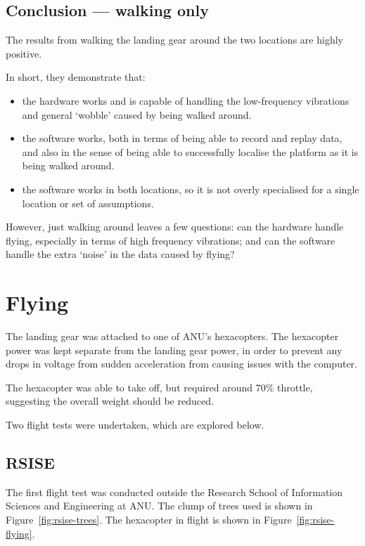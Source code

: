 \documentclass[12pt,oneside,a4paper]{book}
\begin{document}
\subsection{Conclusion --- walking only}
\label{sec:concl-walk-only}

The results from walking the landing gear around the two locations are
highly positive.

In short, they demonstrate that:
\begin{itemize}
\item  the hardware works and is capable of
handling the low-frequency vibrations and general `wobble' caused by
being walked around.
\item the software works, both in terms of being able to record and
  replay data, and also in the sense of being able to successfully
  localise the platform as it is being walked around.
\item the software works in both locations, so it is not overly
  specialised for a single location or set of assumptions.
\end{itemize}

However, just walking around leaves a few questions: can the hardware
handle flying, especially in terms of high frequency vibrations; and
can the software handle the extra `noise' in the data caused by flying?

\section{Flying}
\label{sec:flying}

The landing gear was attached to one of ANU's hexacopters. The
hexacopter power was kept separate from the landing gear power, in
order to prevent any drops in voltage from sudden acceleration from
causing issues with the computer.

The hexacopter was able to take off, but required around 70\%
throttle, suggesting the overall weight should be reduced.

Two flight tests were undertaken, which are explored below.

\subsection{RSISE}
\label{sec:rsise}

The first flight test was conducted outside the Research School of
Information Sciences and Engineering at ANU. The clump of trees used
is shown in Figure~\ref{fig:rsise-trees}. The hexacopter in flight is
shown in Figure~\ref{fig:rsise-flying}.
\end{document}
